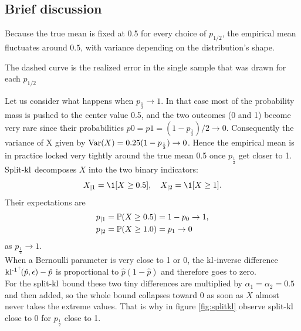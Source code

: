 \subsection*{Brief discussion}
Because the true mean is fixed at 0.5 for every choice of $p_{1/2}$, the empirical mean
fluctuates around $0.5$, with variance depending on the distribution’s
shape. 

The dashed curve is the realized error in the single sample that was
drawn for each $p_{1/2}$

Let us consider what happens when $p_{\frac{1}{2}} \rightarrow 1$. In that case most of 
the probability mass is pushed to the center value 0.5, and the two outcomes (0 and 1) become very rare since their probabilities $p0 = p1 = (1-p_{\frac{1}{2}})/2 \rightarrow  0$.
Consequently the variance of X given by $\Var(X)=0.25(1 -p_{\frac{1}{2}}) \rightarrow  0$.
Hence the empirical mean is in practice locked very tightly
around the true mean 0.5 once $p_{\frac{1}{2}}$ get closer to 1.
\\[2mm]
Split-$\operatorname{kl}$ decomposes $X$ into the two binary indicators:
$$
X_{\mid 1} = \1[X \geq 0.5], \quad X_{\mid 2} = \1[X \geq 1].
$$
Their expectations are
\begin{align*}
    p_{\mid 1} &= \P(X \geq 0.5) = 1 - p_0  \rightarrow 1, \\
    p_{\mid 2} &= \P(X \geq 1.0) = p_1      \rightarrow 0
\end{align*}
as $p_{\frac{1}{2}} \rightarrow 1$.
\\[2mm]
When a Bernoulli parameter is very close to 1 or 0, the
$\operatorname{kl}$-inverse difference $\operatorname{kl^{-1^+}\!}(\hat{p},\epsilon)-\hat{p}$ is proportional to $\hat{p}(1-\hat{p})$ and therefore goes to zero.
\\[2mm]
For the split-$\operatorname{kl}$ bound these two tiny differences are multiplied by
$\alpha_1 = \alpha_2 = 0.5$ and then added, so the whole bound collapses
toward 0 as soon as $X$ almost never takes the extreme values.
That is why in figure \ref{fig:splitkl} observe split-$\operatorname{kl}$ close to 0 for $p_{\frac{1}{2}}$ close to 1.
